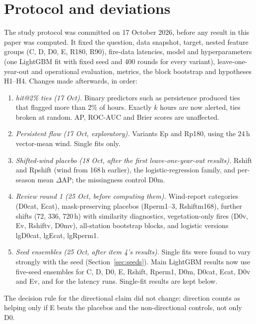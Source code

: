 \section{Protocol and deviations}
\label{app:protocol}

The study protocol was committed on 17 October 2026, before any result in this paper was
computed. It fixed the question, data snapshot, target, nested feature groups (C, D, D0, E, R180,
R90), fire-data latencies, model and hyperparameters (one LightGBM fit with fixed seed and 400
rounds for every variant), leave-one-year-out and operational evaluation, metrics, the block
bootstrap and hypotheses H1--H4. Changes made afterwards, in order:

\begin{enumerate}
  \item \emph{hit@2\% ties (17 Oct).} Binary predictors such as persistence produced ties that
        flagged more than 2\% of hours. Exactly $k$ hours are now alerted, ties broken at random.
        AP, ROC-AUC and Brier scores are unaffected.
  \item \emph{Persistent flow (17 Oct, exploratory).} Variants Ep and Rp180, using the 24\,h
        vector-mean wind. Single fits only.
  \item \emph{Shifted-wind placebo (18 Oct, after the first leave-one-year-out results).} Rshift
        and Rpshift (wind from 168\,h earlier), the logistic-regression family, and per-season
        mean $\Delta$AP; the missingness control D0m.
  \item \emph{Review round 1 (25 Oct, before computing them).} Wind-report categories (D0cat,
        Ecat), mask-preserving placebos (Rperm1--3, Rshiftm168), further shifts (72, 336,
        720\,h) with similarity diagnostics, vegetation-only fires (D0v, Ev, Rshiftv, D0mv),
        all-station bootstrap blocks, and logistic versions lgD0cat, lgEcat, lgRperm1.
  \item \emph{Seed ensembles (25 Oct, after item 4's results).} Single fits were found to vary
        strongly with the seed (Section~\ref{sec:seeds}). Main LightGBM results now use five-seed
        ensembles for C, D, D0, E, Rshift, Rperm1, D0m, D0cat, Ecat, D0v and Ev, and for the
        latency runs. Single-fit results are kept below.
\end{enumerate}

The decision rule for the directional claim did not change: direction counts as helping only if
E beats the placebos and the non-directional controls, not only D0.


